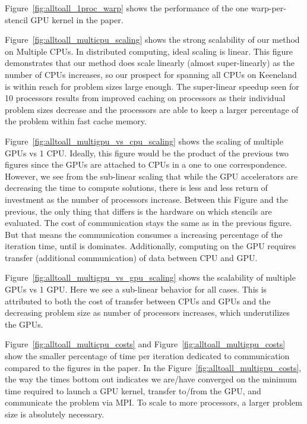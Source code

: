 Figure~\ref{fig:alltoall_1proc_warp} shows the performance of the one warp-per-stencil GPU kernel  in the paper. 

Figure~\ref{fig:alltoall_multicpu_scaling}  shows the strong scalability of our method on Multiple CPUs. In distributed computing, ideal scaling is linear. This figure demonstrates that our method does scale linearly (almost super-linearly) as the number of CPUs increases, so our prospect for spanning all CPUs on Keeneland is within reach for problem sizes large enough. The super-linear speedup seen for 10 processors results from improved caching on processors as their individual problem sizes decrease and the processors are able to keep a larger percentage of the problem within fast cache memory.

Figure~\ref{fig:alltoall_multigpu_vs_cpu_scaling}  shows the scaling of multiple GPUs vs 1 CPU. Ideally, this figure would be the product of the previous two figures since the GPUs are attached to CPUs in a one to one correspondence. However, we see from the sub-linear scaling that while the GPU accelerators are decreasing the time to compute solutions, there is less and less return of investment as the number of processors increase. Between this Figure and the previous, the only thing that differs is the hardware on which stencils are evaluated. The cost of communication stays the same as in the previous figure. But that means the communication consumes a increasing percentage of the iteration time, until is dominates. 
Additionally, computing on the GPU requires transfer (additional communication) of data between CPU and GPU. 

Figure~\ref{fig:alltoall_multigpu_vs_gpu_scaling} shows the scalability of multiple GPUs vs 1 GPU. Here we see a sub-linear behavior for all cases. This is attributed to both the cost of transfer between CPUs and GPUs and the decreasing problem size as number of processors increases, which underutilizes the GPUs. 


Figure~\ref{fig:alltoall_multicpu_costs} and Figure~\ref{fig:alltoall_multigpu_costs} show the smaller percentage of time per iteration dedicated to communication compared to the figures in the paper. In the Figure~\ref{fig:alltoall_multigpu_costs}, the way the times bottom out indicates we are/have converged on the minimum time required to launch a GPU kernel, transfer to/from the GPU, and communicate the problem via MPI. To scale to more processors, a larger problem size is absolutely necessary.


